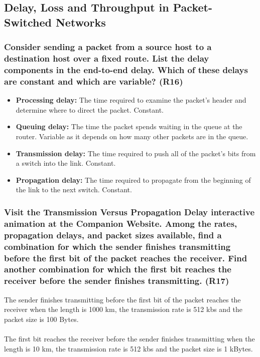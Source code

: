 \subsection{Delay, Loss and Throughput in Packet-Switched Networks}

\subsubsection{Consider sending a packet from a source host to a destination host over a fixed route. List the delay components in the end-to-end delay. Which of these delays are constant and which are variable? (R16)}
\begin{itemize}
    \item \textbf{Processing delay:} The time required to examine the packet's header and determine where to direct the packet. Constant.
    \item \textbf{Queuing delay:} The time the packet spends waiting in the queue at the router. Variable as it depends on how many other packets are in the queue.
    \item \textbf{Transmission delay:} The time required to push all of the packet's bits from a switch into the link. Constant.
    \item \textbf{Propagation delay:} The time required to propagate from the beginning of the link to the next switch. Constant.
\end{itemize}



\subsubsection{Visit the Transmission Versus Propagation Delay interactive animation at the Companion Website. Among the rates, propagation delays, and packet sizes available, find a combination for which the sender finishes transmitting before the first bit of the packet reaches the receiver. Find another combination for which the first bit reaches the receiver before the sender finishes transmitting. (R17)}

The sender finishes transmitting before the first bit of the packet reaches the receiver when the length is 1000 km, the transmission rate is 512 kbs and the packet size is 100 Bytes. \\
\\
The first bit reaches the receiver before the sender finishes transmitting when the length is 10 km, the transmission rate is 512 kbs and the packet size is 1 kBytes.




